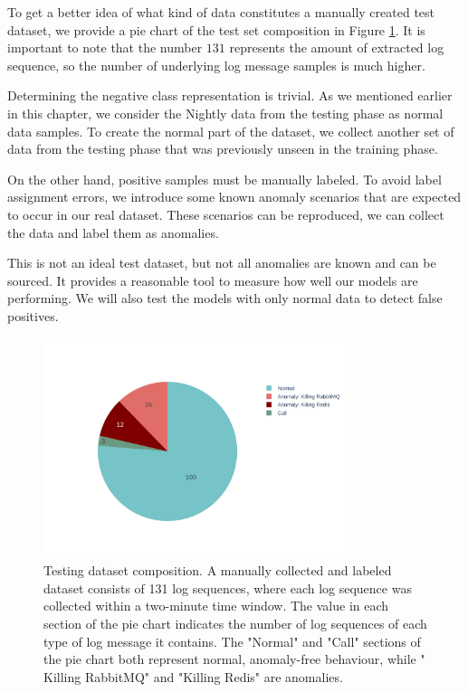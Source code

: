 To get a better idea of what kind of data constitutes a manually created test dataset, we provide a pie chart of the test set composition in Figure \ref{fig:testset-composition}. It is important to note that the number $131$ represents the amount of extracted log sequence, so the number of underlying log message samples is much higher.

Determining the negative class representation is trivial. As we mentioned earlier in this chapter, we consider the Nightly data from the testing phase as normal data samples. To create the normal part of the dataset, we collect another set of data from the testing phase that was previously unseen in the training phase. 

On the other hand, positive samples must be manually labeled. To avoid label assignment errors, we introduce some known anomaly scenarios that are expected to occur in our real dataset. These scenarios can be reproduced, we can collect the data and label them as anomalies. 

This is not an ideal test dataset, but not all anomalies are known and can be sourced. It provides a reasonable tool to measure how well our models are performing. We will also test the models with only normal data to detect false positives. 

\begin{figure}[h]
    \centering
    \includegraphics[width=0.8\textwidth]{img/testset-composition.pdf}
    \caption{Testing dataset composition. A manually collected and labeled dataset consists of 131 log sequences, where each log sequence was collected within a two-minute time window. The value in each section of the pie chart indicates the number of log sequences of each type of log message it contains. The "Normal" and "Call" sections of the pie chart both represent normal, anomaly-free behaviour, while " Killing RabbitMQ" and "Killing Redis" are anomalies.}
    \label{fig:testset-composition}
\end{figure}

